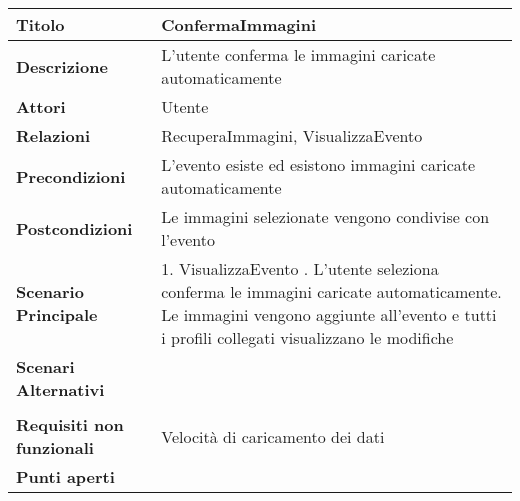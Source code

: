 \begin{tabular} {|P{4.5cm}|P{12.5cm}|}
  \hline
  \textbf{Titolo}                   & ConfermaImmagini                                              \\
  \hline
  \textbf{Descrizione}              & L'utente conferma le immagini caricate automaticamente        \\
  \hline
  \textbf{Attori}                   & Utente                                                        \\
  \hline
  \textbf{Relazioni}                & RecuperaImmagini, VisualizzaEvento                            \\
  \hline
  \textbf{Precondizioni}            & L'evento esiste ed esistono immagini caricate automaticamente \\
  \hline
  \textbf{Postcondizioni}           & Le immagini selezionate vengono condivise con l'evento        \\
  \hline
  \textbf{Scenario Principale}      & 1. VisualizzaEvento . L'utente seleziona conferma le immagini caricate automaticamente. Le immagini vengono aggiunte all'evento e tutti i profili collegati visualizzano le modifiche  \\
  \textbf{Scenari Alternativi}      &                                                               \\                                                                                                                                                                                \\
  \hline
  \textbf{Requisiti non funzionali} & Velocità di caricamento dei dati                              \\
  \hline
  \textbf{Punti aperti}             &                                                               \\
  \hline
\end{tabular}
\hfill
\break

